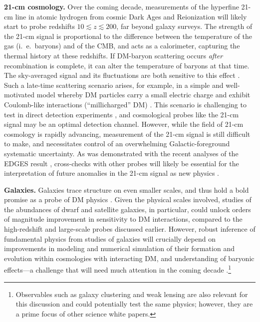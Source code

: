 \documentclass[12pt]{article}
\begin{document}
\textbf{21-cm cosmology.} 
Over the coming decade, measurements of the hyperfine 21-cm line in atomic hydrogen from cosmic Dark Ages and Reionization will likely start to probe redshifts $10 \lesssim z \lesssim 200$, far beyond galaxy surveys.
The strength of the 21-cm signal is proportional to the difference between the temperature of the gas (i.~e.~baryons) and of the CMB, and acts as a calorimeter, capturing the thermal history at these redshifts.
If DM-baryon scattering occurs \textit{after} recombination is complete, it can alter the temperature of baryons at that time. 
The sky-averaged signal and its fluctuations are both sensitive to this effect \cite{Munoz_15, Barkana_18, Fialkov_18, Munoz_18,2018arXiv180210094M}.
Such a late-time scattering scenario arises, for example, in a simple and well-motivated model whereby DM particles carry a small electric charge and exhibit Coulomb-like interactions (``millicharged'' DM) \cite{2017arXiv170704591B,2019arXiv190208623D}.
This scenario is challenging to test in direct detection experiments \cite{2011PhRvD..83f3509M}, and cosmological probes like the 21-cm signal may be an optimal detection channel.
However, while the field of 21-cm cosmology is rapidly advancing, measurement of the 21-cm signal is still difficult to make, and necessitates control of an overwhelming Galactic-foreground systematic uncertainty. 
As was demonstrated with the recent analyses of the EDGES result \cite{Bowman_18}, cross-checks with other probes will likely be essential for the interpretation of future anomalies in the 21-cm signal as new physics \cite{Barkana:2018lgd,Kovetz:2018zan,Berlin:2018sjs}. 

\textbf{Galaxies.}
Galaxies trace structure on even smaller scales, and thus hold a bold promise as a probe of DM physics \cite{2019arXiv190201055D}.
Given the physical scales involved, studies of the abundances of dwarf and satellite galaxies, in particular, could unlock orders of magnitude improvement in sensitivity to DM interactions, compared to the high-redshift and large-scale probes discussed earlier.
However, robust inference of fundamental physics from studies of galaxies will crucially depend on improvements in modeling and numerical simulation of their formation and evolution within cosmologies with interacting DM, and understanding of baryonic effects---a challenge that will need much attention in the coming decade \cite{2019arXiv190201055D}.\footnote{Observables such as galaxy clustering and weak lensing are also relevant for this discussion and could potentially test the same physics; however, they are a prime focus of other science white papers.}
\end{document}
